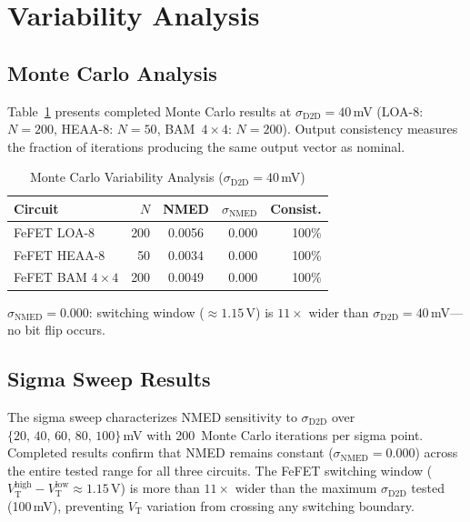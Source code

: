 \documentclass[letterpaper, 10 pt, conference]{ieeeconf}  %
\newcommand{\VT}{V_{\mathrm{T}}}
\newcommand{\sigDD}{\sigma_{\mathrm{D2D}}}
\newcommand{\sigNMED}{\sigma_{\mathrm{NMED}}}
\begin{document}
\section{Variability Analysis}

\subsection{Monte Carlo Analysis}

Table~\ref{tab:mc} presents completed Monte Carlo results at $\sigDD = 40$\,mV
(LOA-8: $N = 200$, HEAA-8: $N = 50$, BAM~$4\times4$: $N = 200$). Output
consistency measures the fraction of iterations producing the same output
vector as nominal.

\begin{table}[t]
  \caption{Monte Carlo Variability Analysis ($\sigDD = 40$\,mV)}
  \label{tab:mc}
  \begin{center}
    \small
    \begin{tabular}{lrcrr}
      \toprule
      \textbf{Circuit} & $N$ & \textbf{NMED} & $\sigNMED$ & \textbf{Consist.} \\
      \midrule
      FeFET LOA-8          & 200 & 0.0056 & 0.000 & 100\% \\
      FeFET HEAA-8         &  50 & 0.0034 & 0.000 & 100\% \\
      FeFET BAM $4{\times}4$ & 200 & 0.0049 & 0.000 & 100\% \\
      \bottomrule
    \end{tabular}
  \end{center}
  \vspace{1pt}
  {\footnotesize $\sigNMED = 0.000$: switching window
  ($\approx\!1.15$\,V) is $11\times$ wider than $\sigDD = 40$\,mV---no bit
  flip occurs.}
\end{table}

\subsection{Sigma Sweep Results}

The sigma sweep characterizes NMED sensitivity to $\sigDD$ over
$\{20,\,40,\,60,\,80,\,100\}$\,mV with 200~Monte Carlo iterations per sigma
point. Completed results confirm that NMED remains constant ($\sigNMED =
0.000$) across the entire tested range for all three circuits. The FeFET
switching window ($\VT^{\mathrm{high}} - \VT^{\mathrm{low}} \approx 1.15$\,V)
is more than $11\times$ wider than the maximum $\sigDD$ tested (100\,mV),
preventing $\VT$ variation from crossing any switching boundary.
\end{document}
